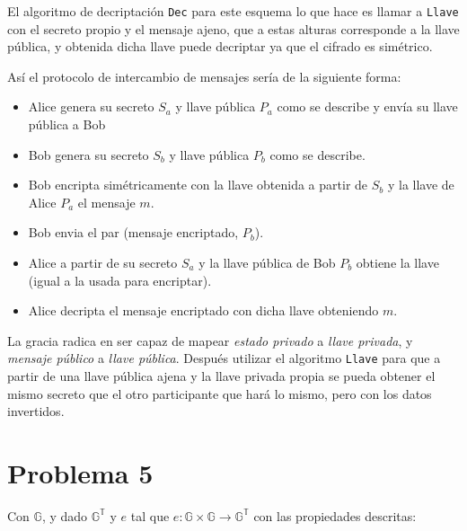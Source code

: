 \documentclass[twoside]{tareas}
\begin{document}
El algoritmo de decriptación \texttt{Dec} para este esquema lo que hace es llamar a \texttt{Llave} con el secreto propio y el mensaje ajeno, que a estas alturas corresponde a la llave pública, y obtenida dicha llave puede decriptar ya que el cifrado es simétrico.

Así el protocolo de intercambio de mensajes sería de la siguiente forma:
\begin{itemize}
    \item Alice genera su secreto $S_a$ y llave pública $P_a$ como se describe y envía su llave pública a Bob
    \item Bob genera su secreto $S_b$ y llave pública $P_b$ como se describe.
    \item Bob encripta simétricamente con la llave obtenida a partir de $S_b$ y la llave de Alice $P_a$ el mensaje $m$.
    \item Bob envia el par (mensaje encriptado, $P_b$).
    \item Alice a partir de su secreto $S_a$ y la llave pública de Bob $P_b$ obtiene la llave (igual a la usada para encriptar).
    \item Alice decripta el mensaje encriptado con dicha llave obteniendo $m$.
\end{itemize}

La gracia radica en ser capaz de mapear \textit{estado privado} a \textit{llave privada}, y \textit{mensaje público} a \textit{llave pública}. Después utilizar el algoritmo \texttt{Llave} para que a partir de una llave pública ajena y la llave privada propia se pueda obtener el mismo secreto que el otro participante que hará lo mismo, pero con los datos invertidos.


\section*{Problema 5}

Con $\mathbb{G}$, y dado $\mathbb{G^T}$ y $e$ tal que $e: \mathbb{G} \times \mathbb{G} \rightarrow \mathbb{G^T}$ con las propiedades descritas:
\end{document}
